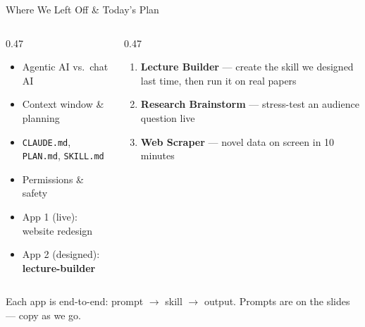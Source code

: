 \documentclass[aspectratio=169, 10pt]{beamer}
\begin{document}
\begin{frame}{Where We Left Off \& Today's Plan}
\begin{columns}[T]
\begin{column}{0.47\textwidth}
\begin{tcolorbox}[keybox, title={\faHistory\quad From Session 1}]
\scriptsize
\begin{itemize}\setlength{\itemsep}{2pt}
  \item Agentic AI vs.\ chat AI
  \item Context window \& planning
  \item \texttt{CLAUDE.md}, \texttt{PLAN.md}, \texttt{SKILL.md}
  \item Permissions \& safety
  \item App 1 (live): website redesign
  \item App 2 (designed): \textbf{lecture-builder}
\end{itemize}
\end{tcolorbox}
\end{column}
\begin{column}{0.47\textwidth}
\begin{tcolorbox}[keybox, title={\faRocket\quad Today: Three Live Applications}]
\scriptsize
\begin{enumerate}\setlength{\itemsep}{2pt}
  \item \textbf{Lecture Builder} --- create the skill we designed last time, then run it on real papers
  \item \textbf{Research Brainstorm} --- stress-test an audience question live
  \item \textbf{Web Scraper} --- novel data on screen in 10 minutes
\end{enumerate}
\end{tcolorbox}
\end{column}
\end{columns}
\vfill
\begin{center}
\color{CoolGray}\small Each app is end-to-end: prompt $\rightarrow$ skill $\rightarrow$ output. Prompts are on the slides --- copy as we go.
\end{center}
\end{frame}
\end{document}
